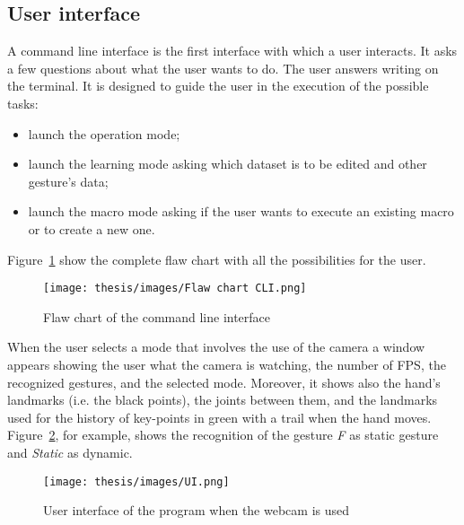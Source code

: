 \documentclass[../thesis.tex]{subfiles}
\begin{document}
\subsection{User interface}
A command line interface is the first interface with which a user interacts. It asks a few questions about what the user wants to do. The user answers writing on the terminal. It is designed to guide the user in the execution of the possible tasks:
\begin{itemize}
    \item launch the operation mode;
    \item launch the learning mode asking which dataset is to be edited and other gesture's data;
    \item launch the macro mode asking if the user wants to execute an existing macro or to create a new one.
\end{itemize}
Figure~\ref{fig:flaw_chart_cli} show the complete flaw chart with all the possibilities for the user.
\begin{figure}[H]
    \centering
    \texttt{[image: thesis/images/Flaw chart CLI.png]}
    \caption{Flaw chart of the command line interface}
    \label{fig:flaw_chart_cli}
\end{figure}

When the user selects a mode that involves the use of the camera a window appears showing the user what the camera is watching, the number of FPS, the recognized gestures, and the selected mode. Moreover, it shows also the hand's landmarks (i.e. the black points), the joints between them, and the landmarks used for the history of key-points in green with a trail when the hand moves. Figure~\ref{fig:example_ui}, for example, shows the recognition of the gesture \textit{F} as static gesture and \textit{Static} as dynamic.

\begin{figure}
    \centering
    \texttt{[image: thesis/images/UI.png]}
    \caption{User interface of the program when the webcam is used}
    \label{fig:example_ui}
\end{figure}
\end{document}
